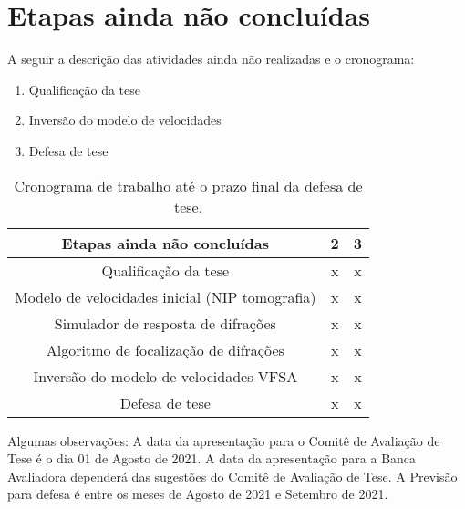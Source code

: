 \section{Etapas ainda não concluídas}

A seguir a descrição das atividades ainda não realizadas e o cronograma:

  \begin{enumerate}
   \item Qualificação da tese
   \item Inversão do modelo de velocidades
   \item Defesa de tese
  \end{enumerate}
  
   \begin{table}[H]
      \caption{Cronograma de trabalho até o prazo final da defesa de tese.}
      \centering
      
      \begin{tabular}{|c|c|c|}

      \hline
      \textbf{Etapas ainda não concluídas} & 2 & 3 \\ \hline
      Qualificação da tese & x & x \\ \hline
      Modelo de velocidades inicial (NIP tomografia) & x & x \\ \hline
      Simulador de resposta de difrações & x & x \\ \hline
      Algoritmo de focalização de difrações & x & x \\ \hline
      Inversão do modelo de velocidades VFSA & x & x \\ \hline
      Defesa de tese & x & x  \\
      \hline
      
      \end{tabular}
  \end{table}
  

Algumas observações: A data da apresentação para o Comitê de Avaliação de Tese é o dia 01 de Agosto de 2021.
A data da apresentação para a Banca Avaliadora dependerá das sugestões do
Comitê de Avaliação de Tese. A Previsão para defesa é entre os meses de Agosto de
2021 e Setembro de 2021.

